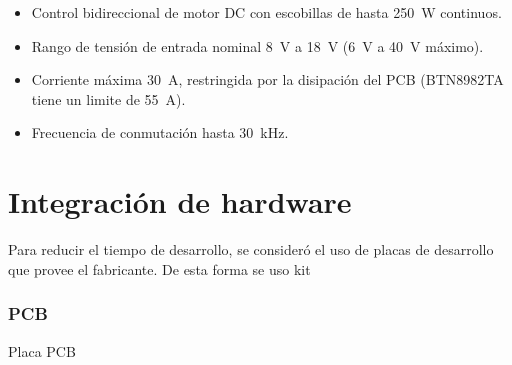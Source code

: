 \begin{itemize}
\item Control bidireccional de motor DC con escobillas de hasta \SI{250}{\watt} continuos.
\item Rango de tensión de entrada nominal \SI{8}{\volt} a \SI{18}{\volt} (\SI{6}{\volt} a \SI{40}{\volt} máximo).
\item Corriente máxima \SI{30}{\ampere}, restringida por la disipación del PCB (BTN8982TA tiene un limite de \SI{55}{\ampere}).
\item Frecuencia de conmutación hasta \SI{30}{\kilo\hertz}.
\end{itemize}


\section{Integración de hardware}

Para reducir el tiempo de desarrollo, se consideró el uso de placas de desarrollo que provee el fabricante. De esta forma se uso kit 

\subsubsection{PCB}

Placa PCB



